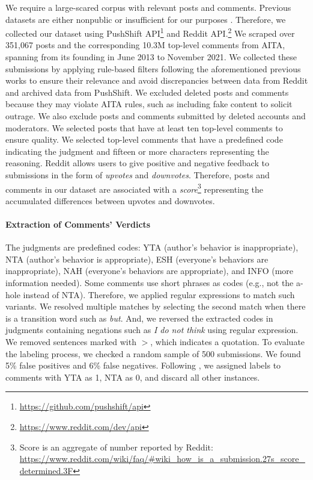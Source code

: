 \documentclass[letterpaper]{article} %
\begin{document}
We require a large-scared corpus with relevant posts and comments.
Previous datasets are either nonpublic \cite{zhou-2021-assessing, candia-2022-demo, botzer-2022-analysis} or insufficient for our purposes \cite{lourie-2020-scruples, nguyen-2022-mapping}.
Therefore, we collected our dataset using PushShift API\footnote{\url{https://github.com/pushshift/api}} and Reddit API.\footnote{\url{https://www.reddit.com/dev/api}}
We scraped over 351,067 posts and the corresponding 10.3M top-level comments from AITA, spanning from its founding in June 2013 to November 2021.
We collected these submissions by applying rule-based filters following the aforementioned previous works to ensure their relevance and avoid discrepancies between data from Reddit and archived data from PushShift. 
We excluded deleted posts and comments because they may violate AITA rules, such as including fake content to solicit outrage.
We also exclude posts and comments submitted by deleted accounts and moderators.
We selected posts that have at least ten top-level comments to ensure quality.
We selected top-level comments that have a predefined code indicating the judgment and fifteen or more characters representing the reasoning.
Reddit allows users to give positive and negative feedback to submissions in the form of \textsl{upvotes} and \textsl{downvotes}.
Therefore, posts and comments in our dataset are associated with a \textsl{score}\footnote{Score is an aggregate of number reported by Reddit: \url{https://www.reddit.com/wiki/faq/#wiki_how_is_a_submission.27s_score_determined.3F}} representing the accumulated differences between upvotes and downvotes.

\paragraph{Extraction of Comments' Verdicts } 
The judgments are predefined codes: YTA (author's behavior is inappropriate), NTA (author's behavior is appropriate), ESH (everyone's behaviors are inappropriate), NAH (everyone's behaviors are appropriate), and INFO (more information needed).
Some comments use short phrases as codes (e.g., not the a-hole instead of NTA).
Therefore, we applied regular expressions to match such variants.
We resolved multiple matches by selecting the second match when there is a transition word such as \textsl{but}.
And, we reversed the extracted codes in judgments containing negations such as \textsl{I do not think} using regular expression. 
We removed sentences marked with $>$, which indicates a quotation. 
To evaluate the labeling process, we checked a random sample of 500 submissions. 
We found 5\% false positives and 6\% false negatives. 
Following \citet{lourie-2020-scruples}, we assigned labels to comments with YTA as 1, NTA as 0, and discard all other instances.
\end{document}
